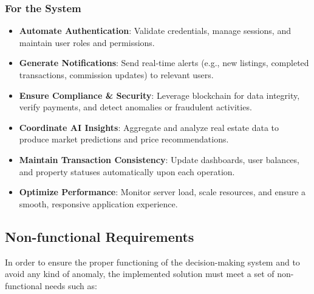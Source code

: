 \subsubsection{For the System}
\begin{itemize}
    \item \textbf{Automate Authentication}: Validate credentials, manage sessions, and maintain user roles and permissions.
    \item \textbf{Generate Notifications}: Send real-time alerts (e.g., new listings, completed transactions, commission updates) to relevant users.
    \item \textbf{Ensure Compliance \& Security}: Leverage blockchain for data integrity, verify payments, and detect anomalies or fraudulent activities.
    \item \textbf{Coordinate AI Insights}: Aggregate and analyze real estate data to produce market predictions and price recommendations.
    \item \textbf{Maintain Transaction Consistency}: Update dashboards, user balances, and property statuses automatically upon each operation.
    \item \textbf{Optimize Performance}: Monitor server load, scale resources, and ensure a smooth, responsive application experience.
\end{itemize} 

\subsection{Non-functional Requirements}

In order to ensure the proper functioning of the decision-making system and to avoid any kind of anomaly, the implemented solution must meet a set of non-functional needs such as:

